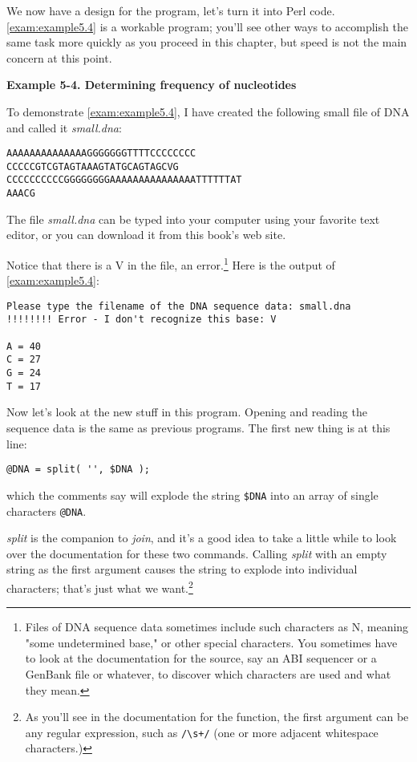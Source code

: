 We now have a design for the program, let's turn it into Perl code. \autoref{exam:example5.4} is a workable program; you'll see other ways to accomplish the same task more quickly as you proceed in this chapter, but speed is not the main concern at this point. 

\textbf{Example 5-4. Determining frequency of nucleotides}


To demonstrate \autoref{exam:example5.4}, I have created the following small file of DNA and called it \textit{small.dna}: 

\begin{lstlisting}
AAAAAAAAAAAAAAGGGGGGGTTTTCCCCCCCC
CCCCCGTCGTAGTAAAGTATGCAGTAGCVG
CCCCCCCCCCGGGGGGGGAAAAAAAAAAAAAAATTTTTTAT
AAACG
\end{lstlisting}

The file \textit{small.dna} can be typed into your computer using your favorite text editor, or you can download it from this book's web site.

Notice that there is a V in the file, an error.\footnote{Files of DNA sequence data sometimes include such characters as N, meaning "some undetermined base," or other special characters. You sometimes have to look at the documentation for the source, say an ABI sequencer or a GenBank file or whatever, to discover which characters are used and what they mean.} Here is the output of \autoref{exam:example5.4}:

\begin{lstlisting}
Please type the filename of the DNA sequence data: small.dna
!!!!!!!! Error - I don't recognize this base: V

A = 40
C = 27
G = 24
T = 17
\end{lstlisting}

Now let's look at the new stuff in this program. Opening and reading the sequence data is the same as previous programs. The first new thing is at this line:

\begin{lstlisting}
@DNA = split( '', $DNA );
\end{lstlisting}

which the comments say will explode the string \verb|$DNA| into an array of single characters \verb|@DNA|.

\textit{split} is the companion to \textit{join}, and it's a good idea to take a little while to look over the documentation for these two commands. Calling \textit{split} with an empty string as the first argument causes the string to explode into individual characters; that's just what we want.\footnote{As you'll see in the documentation for the  function, the first argument can be any regular expression, such as \verb|/\s+/| (one or more adjacent whitespace characters.)}

